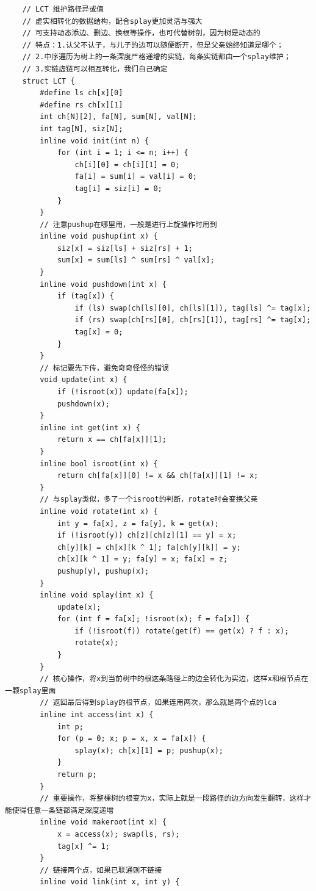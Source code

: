 \documentclass[a4paper,11pt,twoside,fontset = fandol,UTF8]{ctexbook} %
\begin{document}
	\begin{lstlisting}
	// LCT 维护路径异或值
	// 虚实相转化的数据结构，配合splay更加灵活与强大
	// 可支持动态添边、删边、换根等操作，也可代替树剖，因为树是动态的
	// 特点：1.认父不认子，与儿子的边可以随便断开，但是父亲始终知道是哪个；
	// 2.中序遍历为树上的一条深度严格递增的实链，每条实链都由一个splay维护；
	// 3.实链虚链可以相互转化，我们自己确定
	struct LCT {
	    #define ls ch[x][0]
	    #define rs ch[x][1]
	    int ch[N][2], fa[N], sum[N], val[N];
	    int tag[N], siz[N];
	    inline void init(int n) {
	        for (int i = 1; i <= n; i++) {
	            ch[i][0] = ch[i][1] = 0;
	            fa[i] = sum[i] = val[i] = 0;
	            tag[i] = siz[i] = 0;
	        }
	    }
	    // 注意pushup在哪里用，一般是进行上旋操作时用到
	    inline void pushup(int x) {
	        siz[x] = siz[ls] + siz[rs] + 1;
	        sum[x] = sum[ls] ^ sum[rs] ^ val[x];
	    }
	    inline void pushdown(int x) {
	        if (tag[x]) {
	            if (ls) swap(ch[ls][0], ch[ls][1]), tag[ls] ^= tag[x];
	            if (rs) swap(ch[rs][0], ch[rs][1]), tag[rs] ^= tag[x];
	            tag[x] = 0;
	        }
	    }
	    // 标记要先下传，避免奇奇怪怪的错误
	    void update(int x) {
	        if (!isroot(x)) update(fa[x]);
	        pushdown(x);
	    }
	    inline int get(int x) {
	        return x == ch[fa[x]][1];
	    }
	    inline bool isroot(int x) {
	        return ch[fa[x]][0] != x && ch[fa[x]][1] != x;
	    }
	    // 与splay类似，多了一个isroot的判断，rotate时会变换父亲
	    inline void rotate(int x) {
	        int y = fa[x], z = fa[y], k = get(x);
	        if (!isroot(y)) ch[z][ch[z][1] == y] = x;
	        ch[y][k] = ch[x][k ^ 1]; fa[ch[y][k]] = y;
	        ch[x][k ^ 1] = y; fa[y] = x; fa[x] = z;
	        pushup(y), pushup(x);
	    }
	    inline void splay(int x) {
	        update(x);
	        for (int f = fa[x]; !isroot(x); f = fa[x]) {
	            if (!isroot(f)) rotate(get(f) == get(x) ? f : x);
	            rotate(x);
	        }
	    }
	    // 核心操作，将x到当前树中的根这条路径上的边全转化为实边，这样x和根节点在一颗splay里面
	    // 返回最后得到splay的根节点，如果连用两次，那么就是两个点的lca
	    inline int access(int x) {
	        int p;
	        for (p = 0; x; p = x, x = fa[x]) {
	            splay(x); ch[x][1] = p; pushup(x);
	        }
	        return p;
	    }
	    // 重要操作，将整棵树的根变为x，实际上就是一段路径的边方向发生翻转，这样才能使得任意一条链都满足深度递增
	    inline void makeroot(int x) {
	        x = access(x); swap(ls, rs);
	        tag[x] ^= 1;
	    }
	    // 链接两个点，如果已联通则不链接
	    inline void link(int x, int y) {

\end{lstlisting}
\end{document}
